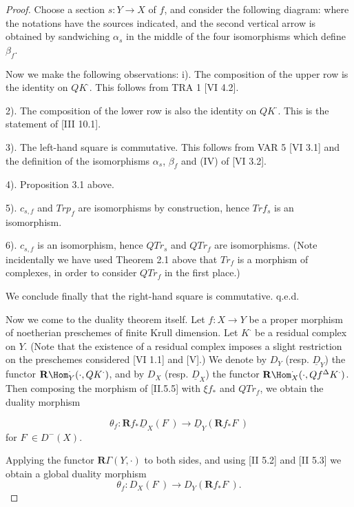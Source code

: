 \documentclass[12pt]{book}
\begin{document}
\setcounter{page}{377}
\begin{proof}
Choose a section \(s: Y \to X\) of \(f\), and consider the following diagram:
where the notations have the sources indicated,
and the second vertical arrow is obtained by sandwiching \(\alpha_{s}\)
in the middle of the four isomorphisms which define \(\beta_{f}\).

Now we make the following observations:
i). The composition of the upper row is the identity on \(QK^{\cdot}\).
This follows from TRA 1 [VI 4.2].

2). The composition of the lower row is also the identity on \(QK^{\cdot}\).
This is the statement of [III 10.1].

3). The left-hand square is commutative. This follows from VAR 5 [VI 3.1] and the definition of the isomorphisms \(\alpha_{s}\), \(\beta_{f}\) and (IV) of [VI 3.2].

\setcounter{page}{378}
4). Proposition 3.1 above.

5). \(c_{s,f}\) and \(Trp_{f}\) are isomorphisms by construction, hence \(Trf_{s}\) is an isomorphism.

6). \(c_{s,f}\) is an isomorphism, hence \(Q Tr_{s}\) and \(Q Tr_{f}\) are isomorphisms.
(Note incidentally we have used Theorem 2.1 above that \(Tr_{f}\) is a morphism of complexes,
in order to consider \(Q Tr_{f}\) in the first place.)

We conclude finally that the right-hand square is commutative.
q.e.d.

Now we come to the duality theorem itself.
Let \(f: X \to Y\) be a proper morphism of noetherian preschemes of finite Krull dimension.
Let \(K^{\cdot}\) be a residual complex on \(Y\).
(Note that the existence of a residual complex imposes a slight restriction on the preschemes considered [VI 1.1] and [V].)
We denote by \(D_{Y}\) (resp. \(\underline{D}_{Y}\)) the functor \(\mathbf{R}\Hom_{Y}^{\cdot}(\cdot, Q K^{\cdot})\),
and by \(D_{X}\) (resp. \(\underline{D}_{X}\)) the functor \(\mathbf{R}\Hom_{X}^{\cdot}(\cdot, Q f^{\Delta} K^{\cdot})\).
Then composing the morphism of [II.5.5] with \(\xi f_{*}\) and \(Q Tr_{f}\), we obtain the duality morphism

\setcounter{page}{379}
\[\theta_{f}: \mathbf{R} f_{*} \underline{D}_{X}\left(F^{\cdot}\right) \to \underline{D}_{Y}\left(\mathbf{R} f_{*} F^{\cdot}\right)\]
for \(F^{\cdot} \in D^{-}(X)\).

Applying the functor \(\mathbf{R}\Gamma(Y,\cdot)\) to both sides, and using [II 5.2] and [II 5.3] we obtain a global duality morphism
\[\theta_{f}: D_{X}\left(F^{\cdot}\right) \to D_{Y}\left(\mathbf{R} f_{*} F^{\cdot}\right).\]


\end{proof}
\end{document}

